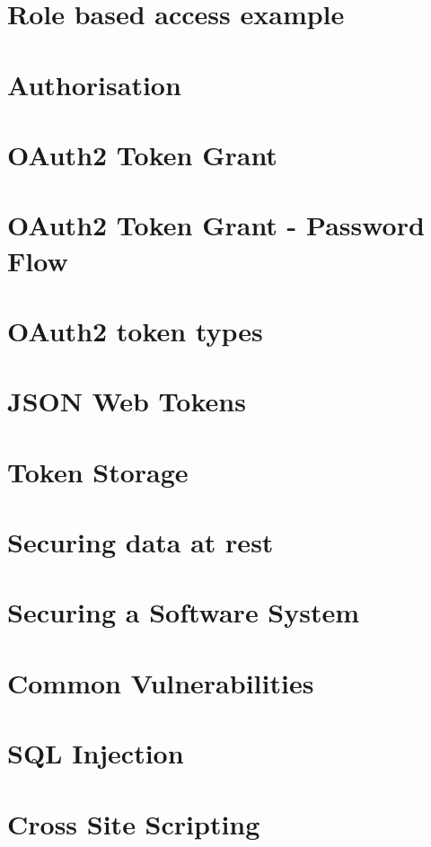 \documentclass[11pt]{article}
\begin{document}
\section{Role based access example}

\section{Authorisation}

\section{OAuth2 Token Grant}

\section{OAuth2 Token Grant - Password Flow}

\section{OAuth2 token types}

\section{JSON Web Tokens}

\section{Token Storage}

\section{Securing data at rest}

\section{Securing a Software System}

\section{Common Vulnerabilities}

\section{SQL Injection}

\section{Cross Site Scripting}
\end{document}
